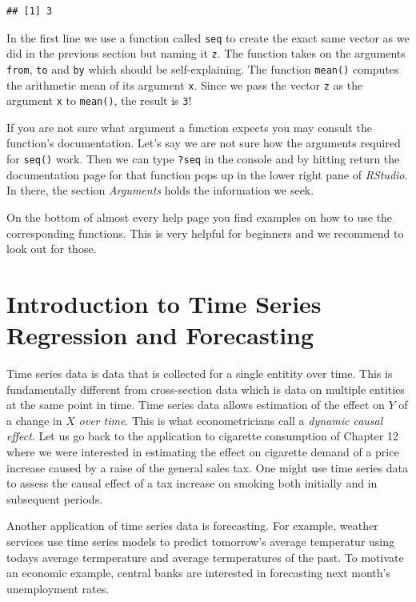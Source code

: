 \documentclass[]{book}
\theoremstyle{definition}
\theoremstyle{definition}
\theoremstyle{definition}
\theoremstyle{remark}
\begin{document}
\begin{verbatim}
## [1] 3
\end{verbatim}

In the first line we use a function called \texttt{seq} to create the
exact same vector as we did in the previous section but naming it
\texttt{z}. The function takes on the arguments \texttt{from},
\texttt{to} and \texttt{by} which should be self-explaining. The
function \texttt{mean()} computes the arithmetic mean of its argument
\texttt{x}. Since we pass the vector \texttt{z} as the argument
\texttt{x} to \texttt{mean()}, the result is \texttt{3}!

If you are not sure what argument a function expects you may consult the
function's documentation. Let's say we are not sure how the arguments
required for \texttt{seq()} work. Then we can type \texttt{?seq} in the
console and by hitting return the documentation page for that function
pops up in the lower right pane of \emph{RStudio}. In there, the section
\emph{Arguments} holds the information we seek.

On the bottom of almost every help page you find examples on how to use
the corresponding functions. This is very helpful for beginners and we
recommend to look out for those.

\chapter{Introduction to Time Series Regression and
Forecasting}\label{introduction-to-time-series-regression-and-forecasting}

Time series data is data that is collected for a single entitity over
time. This is fundamentally different from cross-section data which is
data on multiple entities at the same point in time. Time series data
allows estimation of the effect on \(Y\) of a change in \(X\) \emph{over
time}. This is what econometricians call a \emph{dynamic causal effect}.
Let us go back to the application to cigarette consumption of Chapter 12
where we were interested in estimating the effect on cigarette demand of
a price increase caused by a raise of the general sales tax. One might
use time series data to assess the causal effect of a tax increase on
smoking both initially and in subsequent periods.

Another application of time series data is forecasting. For example,
weather services use time series models to predict tomorrow's average
temperatur using todays average termperature and average termperatures
of the past. To motivate an economic example, central banks are
interested in forecasting next month's unemployment rates.
\end{document}
